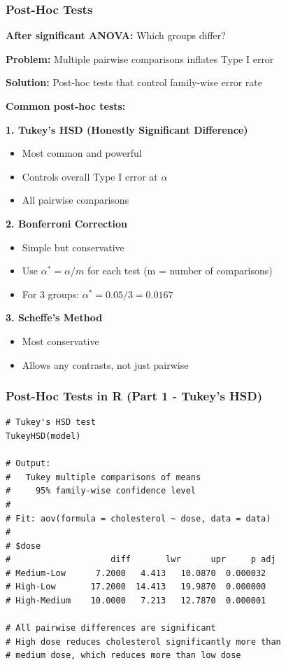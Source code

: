 \documentclass{beamer}
\begin{document}
\begin{frame}
\frametitle{Post-Hoc Tests}
\textbf{After significant ANOVA:} Which groups differ?

\vspace{0.2cm}
\textbf{Problem:} Multiple pairwise comparisons inflates Type I error

\vspace{0.2cm}
\textbf{Solution:} Post-hoc tests that control family-wise error rate

\vspace{0.2cm}
\textbf{Common post-hoc tests:}

\vspace{0.2cm}
\textbf{1. Tukey's HSD (Honestly Significant Difference)}
\begin{itemize}
\setlength\itemsep{-0.2em}
\item Most common and powerful
\item Controls overall Type I error at $\alpha$
\item All pairwise comparisons
\end{itemize}

\vspace{0.2cm}
\textbf{2. Bonferroni Correction}
\begin{itemize}
\setlength\itemsep{-0.2em}
\item Simple but conservative
\item Use $\alpha^* = \alpha / m$ for each test (m = number of comparisons)
\item For 3 groups: $\alpha^* = 0.05/3 = 0.0167$
\end{itemize}

\vspace{0.2cm}
\textbf{3. Scheffe's Method}
\begin{itemize}
\setlength\itemsep{-0.2em}
\item Most conservative
\item Allows any contrasts, not just pairwise
\end{itemize}
\end{frame}

\begin{frame}[fragile]
\frametitle{Post-Hoc Tests in R (Part 1 - Tukey's HSD)}
\small
\begin{verbatim}
# Tukey's HSD test
TukeyHSD(model)

# Output:
#   Tukey multiple comparisons of means
#     95% family-wise confidence level
#
# Fit: aov(formula = cholesterol ~ dose, data = data)
#
# $dose
#                    diff       lwr      upr     p adj
# Medium-Low      7.2000   4.413   10.0870  0.000032
# High-Low       17.2000  14.413   19.9870  0.000000
# High-Medium    10.0000   7.213   12.7870  0.000001

# All pairwise differences are significant
# High dose reduces cholesterol significantly more than
# medium dose, which reduces more than low dose
\end{verbatim}
\end{frame}
\end{document}
